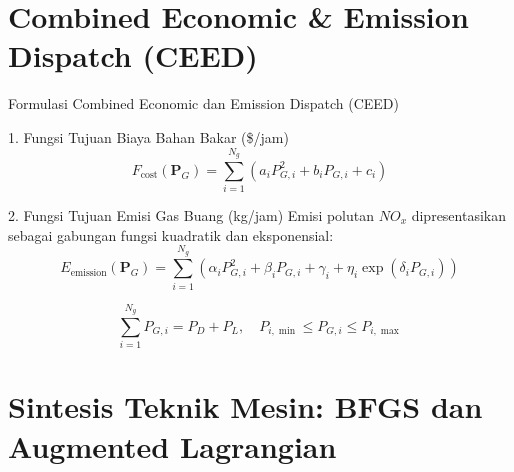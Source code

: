 \documentclass[10pt,aspectratio=169]{beamer}
\begin{document}
\section{Combined Economic & Emission Dispatch (CEED)}

\begin{frame}{Formulasi Combined Economic dan Emission Dispatch (CEED)}
    \begin{block}{1. Fungsi Tujuan Biaya Bahan Bakar (\$/jam)}
        \[
            F_{\text{cost}}(\mathbf{P}_G) = \sum_{i=1}^{N_g} \left( a_i P_{G,i}^2 + b_i P_{G,i} + c_i \right)
        \]
    \end{block}

    \begin{block}{2. Fungsi Tujuan Emisi Gas Buang (kg/jam)}
        Emisi polutan $NO_x$ dipresentasikan sebagai gabungan fungsi kuadratik dan eksponensial:
        \[
            E_{\text{emission}}(\mathbf{P}_G) = \sum_{i=1}^{N_g} \left( \alpha_i P_{G,i}^2 + \beta_i P_{G,i} + \gamma_i + \eta_i \exp(\delta_i P_{G,i}) \right)
        \]
    \end{block}

    \begin{tcolorbox}[colback=white,colframe=darkgreen,title=\textbf{Kendala Operasional Utama}]
        \[
            \sum_{i=1}^{N_g} P_{G,i} = P_D + P_L, \quad P_{i,\min} \le P_{G,i} \le P_{i,\max}
        \]
    \end{tcolorbox}
\end{frame}

\section{Sintesis Teknik Mesin: BFGS dan Augmented Lagrangian}
\end{document}
